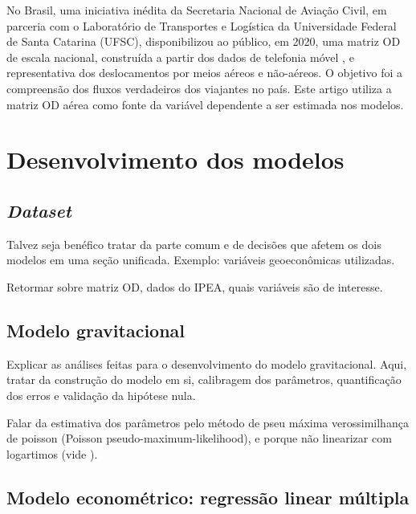 \documentclass[a4paper,9pt,twocolumn,twoside,]{pinp}
\begin{document}
No Brasil, uma iniciativa inédita da Secretaria Nacional de Aviação
Civil, em parceria com o Laboratório de Transportes e Logística da
Universidade Federal de Santa Catarina (UFSC), disponibilizou ao
público, em 2020, uma matriz OD de escala nacional, construída a partir
dos dados de telefonia móvel
\citep{coordenacao-geral_de_planejamento_pesquisas_e_estudos_da_aviacao_civil_matriz_2020},
e representativa dos deslocamentos por meios aéreos e não-aéreos. O
objetivo foi a compreensão dos fluxos verdadeiros dos viajantes no país.
Este artigo utiliza a matriz OD aérea como fonte da variável dependente
a ser estimada nos modelos.

\hypertarget{desenvolvimento-dos-modelos}{%
\section{Desenvolvimento dos
modelos}\label{desenvolvimento-dos-modelos}}

\hypertarget{dataset}{%
\subsection{\texorpdfstring{\emph{Dataset}}{Dataset}}\label{dataset}}

Talvez seja benéfico tratar da parte comum e de decisões que afetem os
dois modelos em uma seção unificada. Exemplo: variáveis geoeconômicas
utilizadas.

Retormar sobre matriz OD, dados do IPEA, quais variáveis são de
interesse.

\hypertarget{modelo-gravitacional-1}{%
\subsection{Modelo gravitacional}\label{modelo-gravitacional-1}}

Explicar as análises feitas para o desenvolvimento do modelo
gravitacional. Aqui, tratar da construção do modelo em si, calibragem
dos parâmetros, quantificação dos erros e validação da hipótese nula.

Falar da estimativa dos parâmetros pelo método de pseu máxima
verossimilhança de poisson (Poisson pseudo-maximum-likelihood), e porque
não linearizar com logartimos (vide \citet{martinez-zarzoso_log_2011}).

\hypertarget{modelo-economuxe9trico-regressuxe3o-linear-muxfaltipla}{%
\subsection{Modelo econométrico: regressão linear
múltipla}\label{modelo-economuxe9trico-regressuxe3o-linear-muxfaltipla}}
\end{document}
